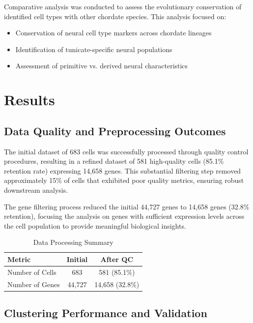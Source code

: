 \documentclass[12pt,a4paper]{article}
\begin{document}
Comparative analysis was conducted to assess the evolutionary conservation of identified cell types with other chordate species. This analysis focused on:

\begin{itemize}
\item Conservation of neural cell type markers across chordate lineages
\item Identification of tunicate-specific neural populations
\item Assessment of primitive vs. derived neural characteristics
\end{itemize}

\section{Results}

\subsection{Data Quality and Preprocessing Outcomes}

The initial dataset of 683 cells was successfully processed through quality control procedures, resulting in a refined dataset of 581 high-quality cells (85.1\% retention rate) expressing 14,658 genes. This substantial filtering step removed approximately 15\% of cells that exhibited poor quality metrics, ensuring robust downstream analysis.

The gene filtering process reduced the initial 44,727 genes to 14,658 genes (32.8\% retention), focusing the analysis on genes with sufficient expression levels across the cell population to provide meaningful biological insights.

\begin{table}[H]
\centering
\caption{Data Processing Summary}
\begin{tabular}{lcc}
\toprule
\textbf{Metric} & \textbf{Initial} & \textbf{After QC} \\
\midrule
Number of Cells & 683 & 581 (85.1\%) \\
Number of Genes & 44,727 & 14,658 (32.8\%) \\
\bottomrule
\end{tabular}
\end{table}

\subsection{Clustering Performance and Validation}
\end{document}
